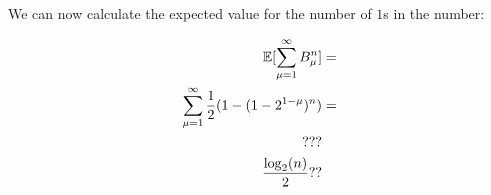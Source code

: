 
We can now calculate the expected value for the number of $1$s in the
number:

\begin{align*}
  \operatorname{\mathbb{E}}[\sum_{\mu = 1}^\infty B^n_\mu] &= \\
  \sum_{\mu = 1}^\infty \frac{1}{2} (1 - (1 - 2^{1 - \mu})^n) &=\\
  ???\\
  \frac{\log_2(n)}{2}??
\end{align*}

